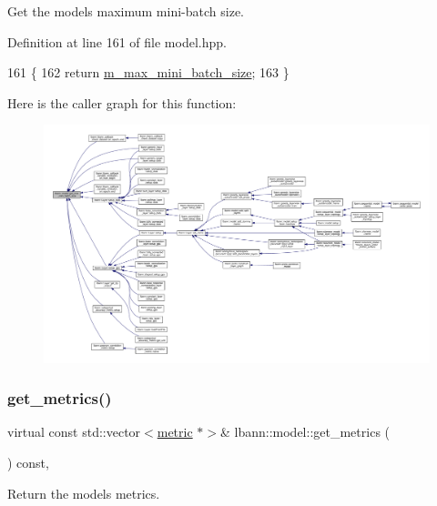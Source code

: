 Get the model\textquotesingle{}s maximum mini-\/batch size. 

Definition at line 161 of file model.\+hpp.


\begin{DoxyCode}
161                                              \{
162     \textcolor{keywordflow}{return} \hyperlink{classlbann_1_1model_acc496503e7cf8d635e5a31ba09b3c81a}{m\_max\_mini\_batch\_size};
163   \}
\end{DoxyCode}
Here is the caller graph for this function\+:\nopagebreak
\begin{figure}[H]
\begin{center}
\leavevmode
\includegraphics[width=350pt]{classlbann_1_1model_a8c311798ff4acaeafdfbf85162ba5084_icgraph}
\end{center}
\end{figure}
\mbox{\label{classlbann_1_1model_a84c738fd219b8c2936e76a9360f68936}} 
\subsubsection{\texorpdfstring{get\+\_\+metrics()}{get\_metrics()}}
{\footnotesize\ttfamily virtual const std\+::vector$<$\hyperlink{classlbann_1_1metric}{metric} $\ast$$>$\& lbann\+::model\+::get\+\_\+metrics (\begin{DoxyParamCaption}{ }\end{DoxyParamCaption}) const\hspace{0.3cm}{\ttfamily [inline]}, {\ttfamily [virtual]}}

Return the model\textquotesingle{}s metrics. 

